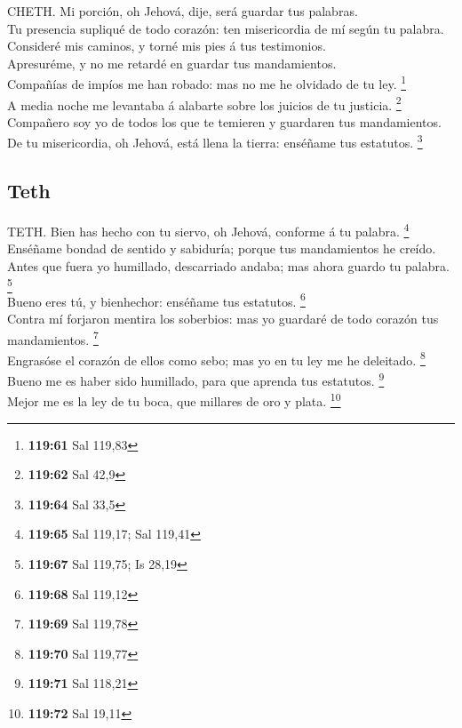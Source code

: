  CHETH. Mi porción, oh Jehová, dije, será guardar tus
palabras.\\
 Tu presencia supliqué de todo corazón: ten misericordia
de mí según tu palabra.\\
 Consideré mis caminos, y torné mis pies á tus
testimonios.\\
 Apresuréme, y no me retardé en guardar tus
mandamientos.\\
 Compañías de impíos me han robado: mas no me he olvidado
de tu ley. \footnote{\textbf{119:61} Sal 119,83}\\
 A media noche me levantaba á alabarte sobre los juicios
de tu justicia. \footnote{\textbf{119:62} Sal 42,9}\\
 Compañero soy yo de todos los que te temieren y
guardaren tus mandamientos.\\
 De tu misericordia, oh Jehová, está llena la tierra:
enséñame tus estatutos. \footnote{\textbf{119:64} Sal 33,5}

\hypertarget{teth}{%
\subsection{Teth}\label{teth}}

 TETH. Bien has hecho con tu siervo, oh Jehová, conforme
á tu palabra. \footnote{\textbf{119:65} Sal 119,17; Sal 119,41}\\
 Enséñame bondad de sentido y sabiduría; porque tus
mandamientos he creído.\\
 Antes que fuera yo humillado, descarriado andaba; mas
ahora guardo tu palabra. \footnote{\textbf{119:67} Sal 119,75; Is 28,19}\\
 Bueno eres tú, y bienhechor: enséñame tus estatutos.
\footnote{\textbf{119:68} Sal 119,12}\\
 Contra mí forjaron mentira los soberbios: mas yo
guardaré de todo corazón tus mandamientos. \footnote{\textbf{119:69} Sal
  119,78}\\
 Engrasóse el corazón de ellos como sebo; mas yo en tu
ley me he deleitado. \footnote{\textbf{119:70} Sal 119,77}\\
 Bueno me es haber sido humillado, para que aprenda tus
estatutos. \footnote{\textbf{119:71} Sal 118,21}\\
 Mejor me es la ley de tu boca, que millares de oro y
plata. \footnote{\textbf{119:72} Sal 19,11}


